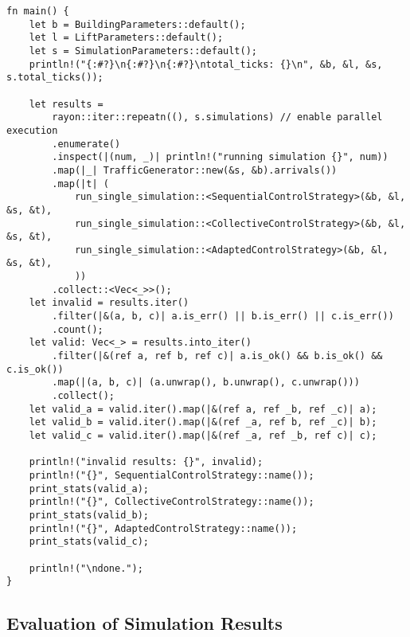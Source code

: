 \begin{lstlisting}[caption={Main function of the simulation program}, label={lst:design:simmain}]
fn main() {
    let b = BuildingParameters::default();
    let l = LiftParameters::default();
    let s = SimulationParameters::default();
    println!("{:#?}\n{:#?}\n{:#?}\ntotal_ticks: {}\n", &b, &l, &s, s.total_ticks());

    let results =
        rayon::iter::repeatn((), s.simulations) // enable parallel execution
        .enumerate()
        .inspect(|(num, _)| println!("running simulation {}", num))
        .map(|_| TrafficGenerator::new(&s, &b).arrivals())
        .map(|t| (
            run_single_simulation::<SequentialControlStrategy>(&b, &l, &s, &t),
            run_single_simulation::<CollectiveControlStrategy>(&b, &l, &s, &t),
            run_single_simulation::<AdaptedControlStrategy>(&b, &l, &s, &t),
            ))
        .collect::<Vec<_>>();
    let invalid = results.iter()
        .filter(|&(a, b, c)| a.is_err() || b.is_err() || c.is_err())
        .count();
    let valid: Vec<_> = results.into_iter()
        .filter(|&(ref a, ref b, ref c)| a.is_ok() && b.is_ok() && c.is_ok())
        .map(|(a, b, c)| (a.unwrap(), b.unwrap(), c.unwrap()))
        .collect();
    let valid_a = valid.iter().map(|&(ref a, ref _b, ref _c)| a);
    let valid_b = valid.iter().map(|&(ref _a, ref b, ref _c)| b);
    let valid_c = valid.iter().map(|&(ref _a, ref _b, ref c)| c);

    println!("invalid results: {}", invalid);
    println!("{}", SequentialControlStrategy::name());
    print_stats(valid_a);
    println!("{}", CollectiveControlStrategy::name());
    print_stats(valid_b);
    println!("{}", AdaptedControlStrategy::name());
    print_stats(valid_c);

    println!("\ndone.");
}
\end{lstlisting}

\subsection{Evaluation of Simulation Results}

